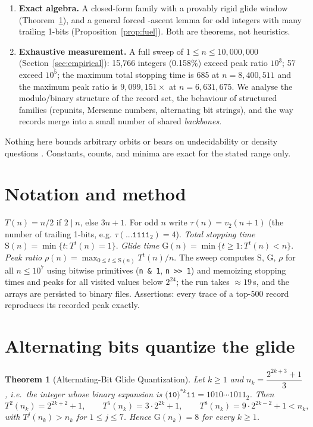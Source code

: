 \documentclass[11pt]{article}
\newtheorem{theorem}{Theorem}
\theoremstyle{remark}
\newcommand{\T}{T}
\newcommand{\vtwo}{v_2}
\begin{document}
\begin{enumerate}
  \item \textbf{Exact algebra.} A closed-form family with a provably rigid
        glide window (Theorem~\ref{thm:altbits}), and a general forced
       -ascent lemma for odd integers with many trailing 1-bits
        (Proposition~\ref{prop:fuel}). Both are theorems, not heuristics.
  \item \textbf{Exhaustive measurement.} A full sweep of $1 \le n \le
        10{,}000{,}000$ (Section~\ref{sec:empirical}): 15{,}766 integers
        (0.158\%) exceed peak ratio $10^3$; 57 exceed $10^5$; the maximum
        total stopping time is 685 at $n = 8{,}400{,}511$ and the maximum
        peak ratio is $9{,}099{,}151\times$ at $n = 6{,}631{,}675$. We
        analyse the modulo/binary structure of the record set, the behaviour
        of structured families (repunits, Mersenne numbers, alternating
        bit strings), and the way records merge into a small number of
        shared \emph{backbones}.
\end{enumerate}

Nothing here bounds arbitrary orbits or bears on undecidability or
density questions \cite{tao2019}. Constants, counts, and minima are exact
for the stated range only.

\section{Notation and method}
$\T(n) = n/2$ if $2 \mid n$, else $3n+1$. For odd $n$ write
$\tau(n) = \vtwo(n+1)$ (the number of trailing 1-bits, e.g.
$\tau(\texttt{...1111}_2) = 4$). \emph{Total stopping time}
$\mathrm{S}(n) = \min\{t : \T^t(n) = 1\}$. \emph{Glide time}
$\mathrm{G}(n) = \min\{t \ge 1 : \T^t(n) < n\}$. \emph{Peak ratio}
$\rho(n) = \max_{0 \le t \le \mathrm{S}(n)} \T^t(n) / n$.
The sweep computes $\mathrm{S}$, $\mathrm{G}$, $\rho$ for all $n \le 10^7$
using bitwise primitives (\verb|n & 1|, \verb|n >> 1|) and memoizing
stopping times and peaks for all visited values below $2^{24}$;
the run takes $\approx 19$\,s, and the arrays are persisted to binary
files. Assertions: every trace of a top-500 record reproduces its recorded
peak exactly.

\section{Alternating bits quantize the glide}
\label{sec:altbits}

\begin{theorem}[Alternating-Bit Glide Quantization]
\label{thm:altbits}
Let $k \ge 1$ and $n_k = \dfrac{2^{2k+3}+1}{3}$, i.e.\ the integer whose
binary expansion is $\texttt{(10)}^{*k}\texttt{11} =
1010\cdots1011_2$. Then
\[
  \T^2(n_k) = 2^{2k+2}+1, \qquad
  \T^5(n_k) = 3\cdot 2^{2k} + 1, \qquad
  \T^8(n_k) = 9\cdot 2^{2k-2} + 1 < n_k,
\]
with $\T^j(n_k) > n_k$ for $1 \le j \le 7$. Hence
$\mathrm{G}(n_k) = 8$ for every $k \ge 1$.
\end{theorem}
\end{document}
